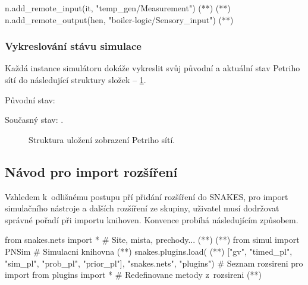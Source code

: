 \begin{python}
  n.add_remote_input(it, "temp_gen/Measurement") (*\label{code:remote_in}*) (*\label{code:remote-in-out}*)
  n.add_remote_output(hen, "boiler-logic/Sensory_input") (*\label{code:remote_out}*)
\end{python}

\subsubsection{Vykreslování stávu simulace}

Každá instance simulátoru dokáže vykreslit svůj původní a aktuální stav Petriho sítí do následující struktury složek -- \ref{fig:draw-stucture}.

Původní stav: 

Současný stav: .

\begin{figure}
  \centering
  \caption{Struktura uložení zobrazení Petriho sítí.}
  \label{fig:draw-stucture}
\end{figure}

\subsection{Návod pro import rozšíření}
Vzhledem k~odlišnému postupu pří přidání rozšíření do SNAKES, pro import simulačního nástroje a dalších rozšíření ze skupiny, uživatel musí dodržovat správné pořadí při importu knihoven. Konvence probíhá následujícím způsobem.

\begin{python}
  from snakes.nets import *   # Site, mista, prechody... (*\label{code:snakes-all}*) (*\label{code:plugin-setup}*)
  from simul import PNSim     # Simulacni knihovna (*\label{code:pnsim}*)
  snakes.plugins.load( (*\label{code:sim-plugins}*)
  ["gv", "timed_pl", "sim_pl", "prob_pl", "prior_pl"],
  "snakes.nets",
  "plugins") # Seznam rozsireni pro import
  from plugins import * # Redefinovane metody z~rozsireni (*\label{code:pl-import}*)
\end{python}

